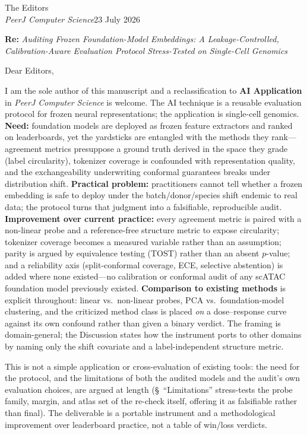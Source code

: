 \documentclass[11pt]{article}
\begin{document}
\noindent The Editors\\ \emph{PeerJ Computer Science}\hfill 23 July 2026

\textbf{Re:} \emph{Auditing Frozen Foundation-Model Embeddings: A Leakage-Controlled, Calibration-Aware Evaluation Protocol Stress-Tested on Single-Cell Genomics}

Dear Editors,

I am the sole author of this manuscript and a reclassification to \textbf{AI Application} in \emph{PeerJ Computer Science} is welcome. The AI technique is a reusable evaluation protocol for frozen neural representations; the application is single-cell genomics. \textbf{Need:} foundation models are deployed as frozen feature extractors and ranked on leaderboards, yet the yardsticks are entangled with the methods they rank---agreement metrics presuppose a ground truth derived in the space they grade (label circularity), tokenizer coverage is confounded with representation quality, and the exchangeability underwriting conformal guarantees breaks under distribution shift. \textbf{Practical problem:} practitioners cannot tell whether a frozen embedding is safe to deploy under the batch/donor/species shift endemic to real data; the protocol turns that judgment into a falsifiable, reproducible audit. \textbf{Improvement over current practice:} every agreement metric is paired with a non-linear probe and a reference-free structure metric to expose circularity; tokenizer coverage becomes a measured variable rather than an assumption; parity is argued by equivalence testing (TOST) rather than an absent $p$-value; and a reliability axis (split-conformal coverage, ECE, selective abstention) is added where none existed---no calibration or conformal audit of any scATAC foundation model previously existed. \textbf{Comparison to existing methods} is explicit throughout: linear vs.\ non-linear probes, PCA vs.\ foundation-model clustering, and the criticized method class is placed \emph{on} a dose--response curve against its own confound rather than given a binary verdict. The framing is domain-general; the Discussion states how the instrument ports to other domains by naming only the shift covariate and a label-independent structure metric.

This is not a simple application or cross-evaluation of existing tools: the need for the protocol, and the limitations of both the audited models and the audit's own evaluation choices, are argued at length (\S~``Limitations'' stress-tests the probe family, margin, and atlas set of the re-check itself, offering it as falsifiable rather than final). The deliverable is a portable instrument and a methodological improvement over leaderboard practice, not a table of win/loss verdicts.
\end{document}
